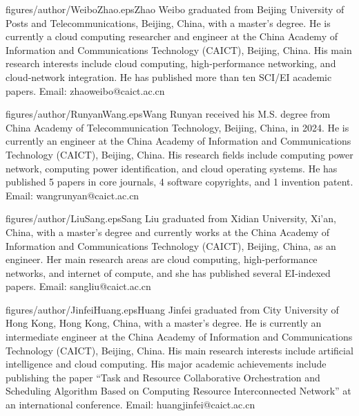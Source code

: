 \documentclass{ccjnl}
\begin{document}
\begin{CCJNLbiography}{figures/author/WeiboZhao.eps}{Zhao Weibo}
	graduated from Beijing University of Posts and Telecommunications, Beijing, China, with a master’s degree. He is currently a cloud computing researcher and engineer at the China Academy of Information and Communications Technology (CAICT), Beijing, China. His main research interests include cloud computing, high-performance networking, and cloud-network integration. He has published more than ten SCI/EI academic papers. Email: zhaoweibo@caict.ac.cn
\end{CCJNLbiography}

\begin{CCJNLbiography}{figures/author/RunyanWang.eps}{Wang Runyan}
	received his M.S. degree from China Academy of Telecommunication Technology, Beijing, China, in 2024. He is currently an engineer at the China Academy of Information and Communications Technology (CAICT), Beijing, China. His research fields include computing power network, computing power identification, and cloud operating systems. He has published 5 papers in core journals, 4 software copyrights, and 1 invention patent. Email: wangrunyan@caict.ac.cn
\end{CCJNLbiography}

\begin{CCJNLbiography}{figures/author/LiuSang.eps}{Sang Liu}
	graduated from Xidian University, Xi'an, China, with a master's degree and currently works at the China Academy of Information and Communications Technology (CAICT), Beijing, China, as an engineer. Her main research areas are cloud computing, high-performance networks, and internet of compute, and she has published several EI-indexed papers. Email: sangliu@caict.ac.cn
\end{CCJNLbiography}

\begin{CCJNLbiography}{figures/author/JinfeiHuang.eps}{Huang Jinfei}
	graduated from City University of Hong Kong, Hong Kong, China, with a master's degree. He is currently an intermediate engineer at the China Academy of Information and Communications Technology (CAICT), Beijing, China. His main research interests include artificial intelligence and cloud computing. His major academic achievements include publishing the paper “Task and Resource Collaborative Orchestration and Scheduling Algorithm Based on Computing Resource Interconnected Network” at an international conference. Email: huangjinfei@caict.ac.cn
\end{CCJNLbiography}
\end{document}
